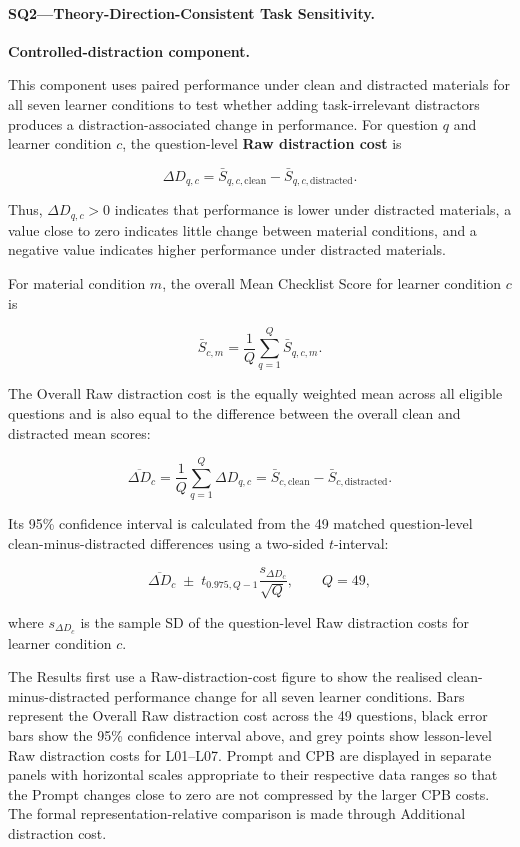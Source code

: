 \paragraph{SQ2---Theory-Direction-Consistent Task Sensitivity.}

\textbf{Controlled-distraction component.}

This component uses paired performance under clean and distracted materials for all seven learner conditions to test whether adding task-irrelevant distractors produces a distraction-associated change in performance. For question $q$ and learner condition $c$, the question-level \textbf{Raw distraction cost} is

\[
\Delta D_{q,c}
=
\bar S_{q,c,\mathrm{clean}}
-
\bar S_{q,c,\mathrm{distracted}}.
\]

Thus, $\Delta D_{q,c}>0$ indicates that performance is lower under distracted materials, a value close to zero indicates little change between material conditions, and a negative value indicates higher performance under distracted materials.

For material condition $m$, the overall Mean Checklist Score for learner condition $c$ is

\[
\bar S_{c,m}
=
\frac{1}{Q}
\sum_{q=1}^{Q}
\bar S_{q,c,m}.
\]

The Overall Raw distraction cost is the equally weighted mean across all eligible questions and is also equal to the difference between the overall clean and distracted mean scores:

\[
\overline{\Delta D}_{c}
=
\frac{1}{Q}
\sum_{q=1}^{Q}
\Delta D_{q,c}
=
\bar S_{c,\mathrm{clean}}
-
\bar S_{c,\mathrm{distracted}}.
\]

Its 95\% confidence interval is calculated from the 49 matched question-level clean-minus-distracted differences using a two-sided $t$-interval:

\[
\overline{\Delta D}_{c}
\;\pm\;
t_{0.975,Q-1}
\frac{s_{\Delta D_c}}{\sqrt{Q}},
\qquad Q=49,
\]

where $s_{\Delta D_c}$ is the sample SD of the question-level Raw distraction costs for learner condition $c$.

The Results first use a Raw-distraction-cost figure to show the realised clean-minus-distracted performance change for all seven learner conditions. Bars represent the Overall Raw distraction cost across the 49 questions, black error bars show the 95\% confidence interval above, and grey points show lesson-level Raw distraction costs for L01--L07. Prompt and CPB are displayed in separate panels with horizontal scales appropriate to their respective data ranges so that the Prompt changes close to zero are not compressed by the larger CPB costs. The formal representation-relative comparison is made through Additional distraction cost.

